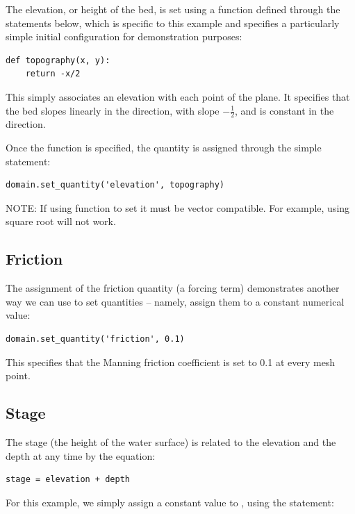 \documentclass{manual}
\begin{document}
The elevation, or height of the bed, is set using a function
defined through the statements below, which is specific to this
example and specifies a particularly simple initial configuration
for demonstration purposes:

\begin{verbatim}
def topography(x, y):
    return -x/2
\end{verbatim}

This simply associates an elevation with each point  of
the plane.  It specifies that the bed slopes linearly in the
 direction, with slope $-\frac{1}{2}$,  and is constant in
the  direction.

Once the function  is specified, the quantity
 is assigned through the simple statement:

\begin{verbatim}
domain.set_quantity('elevation', topography)
\end{verbatim}

NOTE: If using function to set  it must be vector
compatible. For example, using square root will not work.

\subsection{Friction}

The assignment of the friction quantity (a forcing term)
demonstrates another way we can use  to set
quantities -- namely, assign them to a constant numerical value:

\begin{verbatim}
domain.set_quantity('friction', 0.1)
\end{verbatim}

This specifies that the Manning friction coefficient is set to 0.1
at every mesh point.

\subsection{Stage}

The stage (the height of the water surface) is related to the
elevation and the depth at any time by the equation:

\begin{verbatim}
stage = elevation + depth
\end{verbatim}

For this example, we simply assign a constant value to ,
using the statement:
\end{document}
